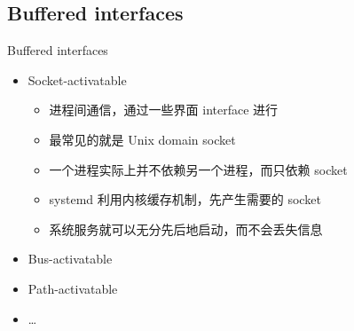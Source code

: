 \documentclass[CJK,xetex]{beamer}
\begin{document}
\subsection{Buffered interfaces}
\begin{frame}{Buffered interfaces}
  \begin{itemize}[<+->]
  \item Socket-activatable
  \begin{itemize}
  \item 进程间通信，通过一些界面 interface 进行
  \item 最常见的就是 Unix domain socket
  \item 一个进程实际上并不依赖另一个进程，而只依赖 socket
  \item systemd 利用内核缓存机制，先产生需要的 socket
  \item 系统服务就可以无分先后地启动，而不会丢失信息
  \end{itemize}
  \item Bus-activatable
  \item Path-activatable
  \item \ldots
  \end{itemize}
\end{frame}
\end{document}
